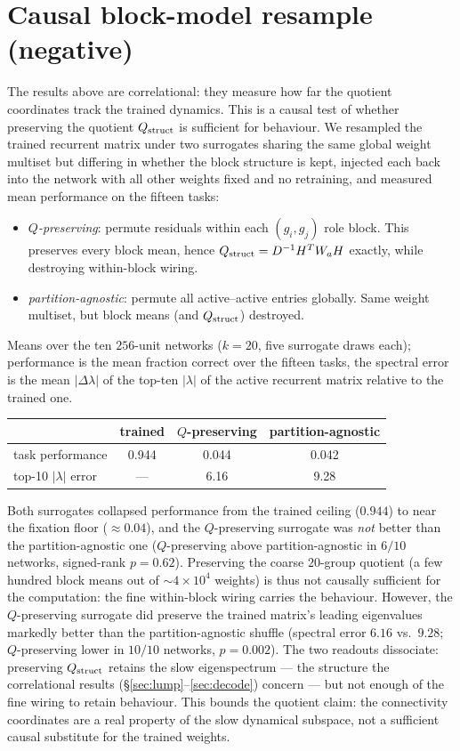 \documentclass[11pt]{article}
\begin{document}
\section{Causal block-model resample (negative)}
\label{sec:causal}
The results above are correlational: they measure how far the quotient coordinates track the
trained dynamics. This is a causal test of whether preserving the quotient $Q_{\rm struct}$ is
sufficient for behaviour. We resampled the trained recurrent matrix under two surrogates sharing
the same global weight multiset but differing in whether the block structure is kept, injected each
back into the network with all other weights fixed and no retraining, and measured mean performance
on the fifteen tasks:
\begin{itemize}\itemsep0pt
\item \emph{$Q$-preserving}: permute residuals within each $(g_i,g_j)$ role block. This preserves
every block mean, hence $Q_{\rm struct}=D^{-1}H^{T}W_{a}H$ exactly, while destroying within-block
wiring.
\item \emph{partition-agnostic}: permute all active--active entries globally. Same weight multiset,
but block means (and $Q_{\rm struct}$) destroyed.
\end{itemize}
Means over the ten $256$-unit networks ($k=20$, five surrogate draws each); performance is the mean
fraction correct over the fifteen tasks, the spectral error is the mean $\lvert\Delta\lambda\rvert$
of the top-ten $\lvert\lambda\rvert$ of the active recurrent matrix relative to the trained one.
\begin{center}\small
\begin{tabular}{lccc}
\toprule
 & trained & $Q$-preserving & partition-agnostic \\
\midrule
task performance                       & 0.944 & 0.044 & 0.042 \\
top-10 $\lvert\lambda\rvert$ error     & ---   & 6.16  & 9.28 \\
\bottomrule
\end{tabular}
\end{center}
Both surrogates collapsed performance from the trained ceiling ($0.944$) to near the fixation
floor ($\approx0.04$), and the $Q$-preserving surrogate was \emph{not} better than the
partition-agnostic one ($Q$-preserving above partition-agnostic in $6/10$ networks, signed-rank
$p=0.62$). Preserving the coarse $20$-group quotient (a few hundred block means out of
$\sim\!4\times10^{4}$ weights) is thus not causally sufficient for the computation: the fine
within-block wiring carries the behaviour. However, the $Q$-preserving surrogate did preserve the
trained matrix's leading eigenvalues markedly better than the partition-agnostic shuffle (spectral
error $6.16$ vs.\ $9.28$; $Q$-preserving lower in $10/10$ networks, $p=0.002$). The two readouts
dissociate: preserving $Q_{\rm struct}$ retains the slow eigenspectrum --- the structure the
correlational results (\S\ref{sec:lump}--\ref{sec:decode}) concern --- but not enough of the fine
wiring to retain behaviour. This bounds the quotient claim: the connectivity coordinates are a real
property of the slow dynamical subspace, not a sufficient causal substitute for the trained weights.
\end{document}
